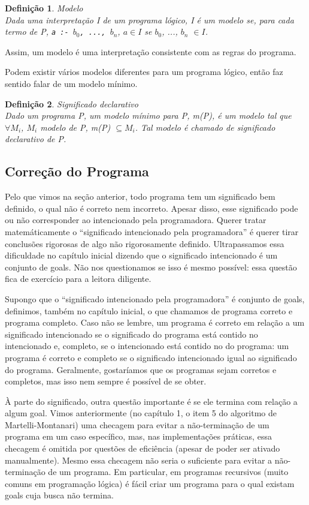 \documentclass{article}
\newtheorem{definition}{Definição}[section]
\theoremstyle{remark}
\begin{document}
\begin{definition}{Modelo}
  \\ Dada uma interpretação I de um programa lógico, I é um modelo se, para cada termo de P, {\tt a :- $b_0$, ..., $b_n$}, $a \in I$ se $b_0$, ..., $b_n$ $\in I$.
\end{definition}

Assim, um modelo é uma interpretação consistente com as regras do programa.

Podem existir vários modelos diferentes para um programa lógico, então faz sentido falar de um modelo mínimo.

\begin{definition}{Significado declarativo}
  \\ Dado um programa P, um modelo mínimo para P, m(P), é um modelo tal que $\forall M_i$, $M_i$ modelo de P, m(P) $\subseteq M_i$. Tal modelo é chamado de significado declarativo de P.
\end{definition}

\subsection{Correção do Programa}

Pelo que vimos na seção anterior, todo programa tem um significado bem definido, o qual não é correto nem incorreto. Apesar disso, esse significado pode ou não corresponder ao intencionado pela programadora. Querer tratar matemáticamente o ``significado intencionado pela programadora'' é querer tirar conclusões rigorosas de algo não rigorosamente definido. Ultrapassamos essa dificuldade no capítulo inicial dizendo que o significado intencionado é um conjunto de goals. Não nos questionamos se isso é mesmo possível: essa questão fica de exercício para a leitora diligente.

Supongo que o ``significado intencionado pela programadora'' é conjunto de goals, definimos, também no capítulo inicial, o que chamamos de programa correto e programa completo. Caso não se lembre, um programa é correto em relação a um significado intencionado se o significado do programa está contido no intencionado e, completo, se o intencionado está contido no do programa: um programa é correto e completo se o significado intencionado igual ao significado do programa.
Geralmente, gostaríamos que os programas sejam corretos e completos, mas isso nem sempre é possível de se obter.

À parte do significado, outra questão importante é se ele termina com relação a algum goal. Vimos anteriormente (no capítulo 1, o item 5 do algoritmo de Martelli-Montanari) uma checagem para evitar a não-terminação de um programa em um caso específico, mas, nas implementações práticas, essa checagem é omitida por questões de eficiência (apesar de poder ser ativado manualmente). Mesmo essa checagem não seria o suficiente para evitar a não-terminação de um programa. Em
particular, em programas recursivos (muito comuns em programação lógica) é fácil criar um programa para o qual existam goals cuja busca não termina.
\end{document}
